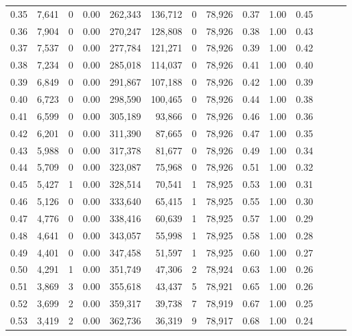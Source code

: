 \begin{tabular}{rrrrrrrrrrrrrr}
0.35 &  7,641 &      0 &  0.00 &  262,343 &  136,712 &       0 &  78,926 &  0.37 &  1.00 &      0.45 \\
0.36 &  7,904 &      0 &  0.00 &  270,247 &  128,808 &       0 &  78,926 &  0.38 &  1.00 &      0.43 \\
0.37 &  7,537 &      0 &  0.00 &  277,784 &  121,271 &       0 &  78,926 &  0.39 &  1.00 &      0.42 \\
0.38 &  7,234 &      0 &  0.00 &  285,018 &  114,037 &       0 &  78,926 &  0.41 &  1.00 &      0.40 \\
0.39 &  6,849 &      0 &  0.00 &  291,867 &  107,188 &       0 &  78,926 &  0.42 &  1.00 &      0.39 \\
0.40 &  6,723 &      0 &  0.00 &  298,590 &  100,465 &       0 &  78,926 &  0.44 &  1.00 &      0.38 \\
0.41 &  6,599 &      0 &  0.00 &  305,189 &   93,866 &       0 &  78,926 &  0.46 &  1.00 &      0.36 \\
0.42 &  6,201 &      0 &  0.00 &  311,390 &   87,665 &       0 &  78,926 &  0.47 &  1.00 &      0.35 \\
0.43 &  5,988 &      0 &  0.00 &  317,378 &   81,677 &       0 &  78,926 &  0.49 &  1.00 &      0.34 \\
0.44 &  5,709 &      0 &  0.00 &  323,087 &   75,968 &       0 &  78,926 &  0.51 &  1.00 &      0.32 \\
0.45 &  5,427 &      1 &  0.00 &  328,514 &   70,541 &       1 &  78,925 &  0.53 &  1.00 &      0.31 \\
0.46 &  5,126 &      0 &  0.00 &  333,640 &   65,415 &       1 &  78,925 &  0.55 &  1.00 &      0.30 \\
0.47 &  4,776 &      0 &  0.00 &  338,416 &   60,639 &       1 &  78,925 &  0.57 &  1.00 &      0.29 \\
0.48 &  4,641 &      0 &  0.00 &  343,057 &   55,998 &       1 &  78,925 &  0.58 &  1.00 &      0.28 \\
0.49 &  4,401 &      0 &  0.00 &  347,458 &   51,597 &       1 &  78,925 &  0.60 &  1.00 &      0.27 \\
0.50 &  4,291 &      1 &  0.00 &  351,749 &   47,306 &       2 &  78,924 &  0.63 &  1.00 &      0.26 \\
0.51 &  3,869 &      3 &  0.00 &  355,618 &   43,437 &       5 &  78,921 &  0.65 &  1.00 &      0.26 \\
0.52 &  3,699 &      2 &  0.00 &  359,317 &   39,738 &       7 &  78,919 &  0.67 &  1.00 &      0.25 \\
0.53 &  3,419 &      2 &  0.00 &  362,736 &   36,319 &       9 &  78,917 &  0.68 &  1.00 &      0.24 \\

\end{tabular}
